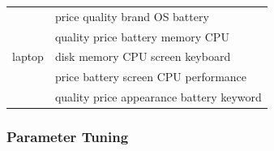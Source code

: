\begin{table}[th]
\begin{tabular}{|c|l|}
			\multirow{5}{*}{laptop}
			& price quality brand OS battery \\
			& quality price battery memory CPU \\
			& disk memory CPU screen keyboard \\
			& price battery screen CPU performance \\ 
			& quality price appearance battery keyword \\\hline
			\end{tabular}
		\end{table}

\subsubsection{Parameter Tuning}
\begin{figure}[th!]
	\centering

\end{figure}
